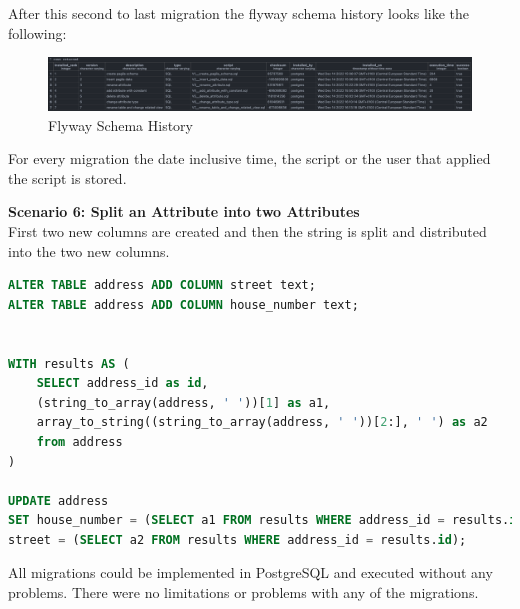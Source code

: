 After this second to last migration the flyway schema history looks like the following:
\begin{figure}[H]
	\centering
	\includegraphics[width=1.1\textwidth]{./chapters/scenarios/images/flyway_schema_history}
	\caption[Flyway Schema History - Source: Own illustration]{Flyway Schema History}
\end{figure}
For every migration the date inclusive time, the script or the user that applied the script is stored.

\newpage
\textbf{Scenario 6: Split an Attribute into two Attributes}\\
%
First two new columns are created and then the string is split and distributed into the two new columns.

\begin{lstlisting}[language=SQL]
ALTER TABLE address ADD COLUMN street text;
ALTER TABLE address ADD COLUMN house_number text;


WITH results AS (
	SELECT address_id as id,
	(string_to_array(address, ' '))[1] as a1,
	array_to_string((string_to_array(address, ' '))[2:], ' ') as a2
	from address
)

UPDATE address
SET house_number = (SELECT a1 FROM results WHERE address_id = results.id),
street = (SELECT a2 FROM results WHERE address_id = results.id);
\end{lstlisting}

All migrations could be implemented in PostgreSQL and executed without any problems. There were no limitations or problems with any of the migrations.


